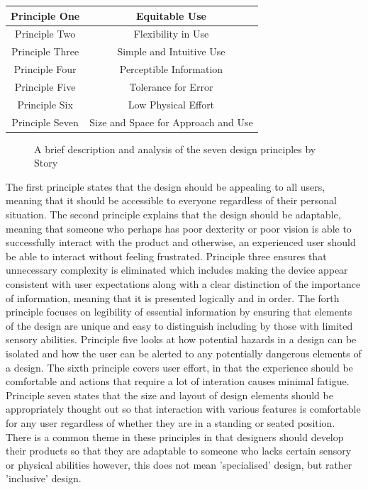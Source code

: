 \begin{center}
    \begin{tabular}{ |c|c| } %
     \hline
     Principle One & Equitable Use \cite{sevenprinciples} \\
     \hline
     Principle Two & Flexibility in Use \cite{sevenprinciples} \\ 
     \hline
     Principle Three & Simple and Intuitive Use \cite{sevenprinciples} \\ 
     \hline
     Principle Four & Perceptible Information \cite{sevenprinciples} \\
     \hline 
     Principle Five & Tolerance for Error \cite{sevenprinciples} \\ 
     \hline
     Principle Six & Low Physical Effort \cite{sevenprinciples} \\ 
     \hline
     Principle Seven & Size and Space for Approach and Use \cite{sevenprinciples} \\
     \hline
    \end{tabular}
\end{center}

\begin{figure}
    \caption{A brief description and analysis of the seven design principles by Story \cite{sevenprinciples}} %
    \label{fig:DesignPrinciples}
\end{figure}

The first principle states that the design should be appealing to all users, meaning that it should be accessible to everyone regardless of their personal situation.
The second principle explains that the design should be adaptable, meaning that someone who perhaps has poor dexterity or poor vision is able to successfully interact with the product and otherwise, an experienced user should be able to interact without feeling frustrated. %
Principle three ensures that unnecessary complexity is eliminated which includes making the device appear consistent with user expectations along with a clear distinction of the importance of information, meaning that it is presented logically and in order.
The forth principle focuses on legibility of essential information by ensuring that elements of the design are unique and easy to distinguish including by those with limited sensory abilities.
Principle five looks at how potential hazards in a design can be isolated and how the user can be alerted to any potentially dangerous elements of a design.
The sixth principle covers user effort, in that the experience should be comfortable and actions that require a lot of interation causes minimal fatigue.
Principle seven states that the size and layout of design elements should be appropriately thought out so that interaction with various features is comfortable for any user regardless of whether they are in a standing or seated position.
There is a common theme in these principles in that designers should develop their products so that they are adaptable to someone who lacks certain sensory or physical abilities however, this does not mean 'specialised' design, but rather 'inclusive' design.

